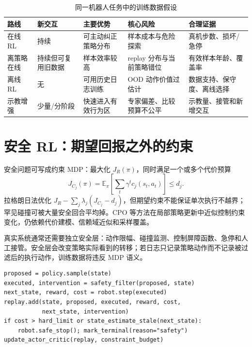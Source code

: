 \begin{table}[H]
\centering
\caption{同一机器人任务中的训练数据假设}
\label{tab:rl-data-regimes}
\begin{tabularx}{\textwidth}{p{}YYYY}
\toprule
路线 & 新交互 & 主要优势 & 核心风险 & 合理证据 \\
\midrule
在线 RL & 持续 & 可主动纠正策略分布 & 样本成本与危险探索 & 真机步数、损坏/急停 \\
离策略在线 & 持续但可复用旧数据 & 样本效率较高 & replay 分布与当前策略错位 & 有效样本年龄、覆盖率 \\
离线 RL & 无 & 可用历史日志训练 & OOD 动作价值过估计 & 数据支持、保守度、离线选择 \\
示教增强 & 少量/分阶段 & 快速进入有效行为区 & 专家偏差、比较预算不公平 & 示教量、接管和新增交互 \\
\bottomrule
\end{tabularx}
\end{table}

\section{安全 RL：期望回报之外的约束}

安全问题可写成约束 MDP：最大化 $J_R(\pi)$，同时满足一个或多个代价预算
\begin{equation}
J_{C_j}(\pi)=\mathbb E_\pi\left[\sum_t\gamma^t c_j(s_t,a_t)\right]\le d_j.
\label{eq:cmdp}
\end{equation}
拉格朗日法优化 $J_R-\sum_j\lambda_j(J_{C_j}-d_j)$，但期望约束不能保证单次执行不越界；罕见碰撞可被大量安全回合平均掉。CPO 等方法在局部策略更新中近似控制约束变化\cite{achiam2017cpo}，仍依赖代价建模、信赖域近似和采样覆盖。

真实系统通常还需要独立安全层：动作限幅、碰撞监测、控制屏障函数、急停和人工接管。安全层会改变策略实际看到的转移；若日志只记录策略动作而不记录被过滤后的执行动作，训练数据将违反 MDP 语义。

\begin{lstlisting}[caption={带执行动作回写和安全终止的在线训练教学伪代码}]
proposed = policy.sample(state)
executed, intervention = safety_filter(proposed, state)
next_state, reward, cost = robot.step(executed)
replay.add(state, proposed, executed, reward, cost,
           next_state, intervention)
if cost > hard_limit or state_estimate_stale(next_state):
    robot.safe_stop(); mark_terminal(reason="safety")
update_actor_critic(replay, constraint_budget)
\end{lstlisting}

